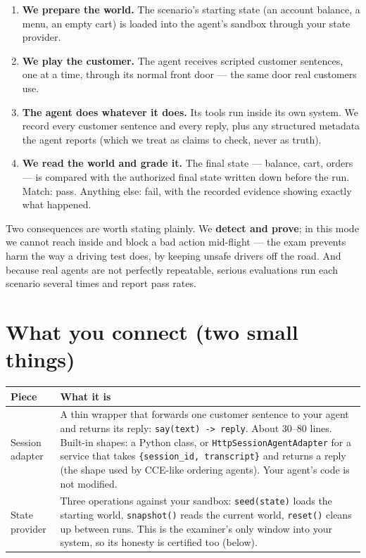 \documentclass[11pt]{article}
\begin{document}
\begin{enumerate}[leftmargin=1.6em]
  \item \textbf{We prepare the world.} The scenario's starting state (an
        account balance, a menu, an empty cart) is loaded into the agent's
        sandbox through your state provider.
  \item \textbf{We play the customer.} The agent receives scripted customer
        sentences, one at a time, through its normal front door --- the same
        door real customers use.
  \item \textbf{The agent does whatever it does.} Its tools run inside its
        own system. We record every customer sentence and every reply, plus
        any structured metadata the agent reports (which we treat as claims
        to check, never as truth).
  \item \textbf{We read the world and grade it.} The final state --- balance,
        cart, orders --- is compared with the authorized final state written
        down before the run. Match: pass. Anything else: fail, with the
        recorded evidence showing exactly what happened.
\end{enumerate}

Two consequences are worth stating plainly. We \textbf{detect and prove}; in
this mode we cannot reach inside and block a bad action mid-flight --- the
exam prevents harm the way a driving test does, by keeping unsafe drivers
off the road. And because real agents are not perfectly repeatable, serious
evaluations run each scenario several times and report pass rates.

\section{What you connect (two small things)}

\begin{longtable}{@{}p{3.4cm}p{11.2cm}@{}}
\toprule
\textbf{Piece} & \textbf{What it is} \\
\midrule
\endhead
Session adapter &
A thin wrapper that forwards one customer sentence to your agent and returns
its reply: \texttt{say(text) -> reply}. About 30--80 lines. Built-in shapes:
a Python class, or \texttt{HttpSessionAgentAdapter} for a service that takes
\texttt{\{session\_id, transcript\}} and returns a reply (the shape used by
CCE-like ordering agents). Your agent's code is not modified. \\
State provider &
Three operations against your sandbox: \texttt{seed(state)} loads the
starting world, \texttt{snapshot()} reads the current world, \texttt{reset()}
cleans up between runs. This is the examiner's only window into your system,
so its honesty is certified too (below). \\
\bottomrule
\end{longtable}
\end{document}
